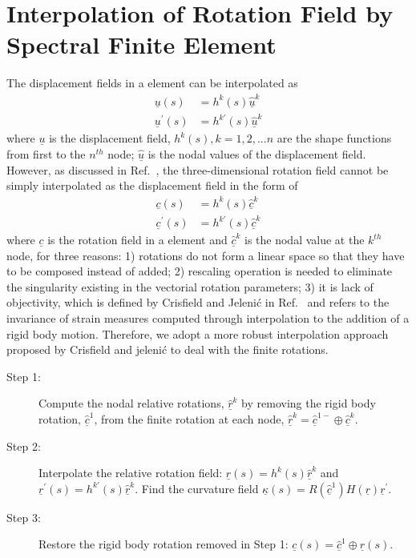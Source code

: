\documentclass{aiaa-tc}
\renewcommand{\vec}[1]{\underline{#1}}
\begin{document}
\section{Interpolation of Rotation Field by Spectral Finite Element}
The displacement fields in a element can be interpolated as
\begin{align}
    \label{InterpolateDisp}
    \vec{u}(s) &= h^k(s) \vec{\hat{u}}^k \\
    \label{InterpolateDispp}
    \vec{u}^\prime(s) &= h^{k\prime}(s) \vec{\hat{u}}^k
\end{align}
where $\vec{u}$ is the displacement field, $h^k(s), k=1,2,...n$ are the shape functions from first to the $n^{th}$ node; $\vec{\hat{u}}$ is the nodal values of the displacement field. However, as discussed in Ref.~\cite{Bauchau:2010}, the three-dimensional rotation field cannot be simply interpolated as the displacement field in the form of
\begin{align}
    \label{InterpolateRot}
    \vec{c}(s) &= h^k(s) \vec{\hat{c}}^k \\
    \label{InterpolateRotp}
    \vec{c}^\prime(s) &= h^{k \prime}(s) \vec{\hat{c}}^k 
\end{align}    
where $\vec{c}$ is the rotation field in a element and $\vec{\hat{c}}^k$ is the nodal value at the $k^{th}$ node, for three reasons: 1) rotations do not form a linear space so that they have to be composed instead of added; 2) rescaling operation is needed to eliminate the singularity existing in the vectorial rotation parameters; 3) it is lack of objectivity, which is defined by Crisfield and Jeleni\'c in Ref.~\cite{Crisfield1999} and refers to the invariance of strain measures computed through interpolation to the addition of a rigid body motion. Therefore, we adopt a more robust interpolation approach proposed by Crisfield and jeleni\'c \cite{Crisfield1999} to deal with the finite rotations.
\begin{description}
    \item[Step 1:] Compute the nodal relative rotations, $\vec{\hat{r}}^k$ by removing the rigid body rotation, $\vec{\hat{c}}^1$, from the finite rotation at each node, $\vec{\hat{r}}^k = \vec{\hat{c}}^{1-} \oplus \vec{\hat{c}}^k$.
    \item[Step 2:] Interpolate the relative rotation field: $\vec{r}(s) = h^k(s) \vec{\hat{r}}^k$ and $\vec{r}^\prime(s) = h^{k \prime}(s) \vec{\hat{r}}^k$. Find the curvature field $\vec{\kappa}(s) = R(\vec{\hat{c}}^1)H(\vec{r}) \vec{r}^\prime$.
    \item[Step 3:] Restore the rigid body rotation removed in Step 1: $\vec{c}(s) = \vec{\hat{c}}^1 \oplus \vec{r}(s)$.
\end{description} 
\end{document}
